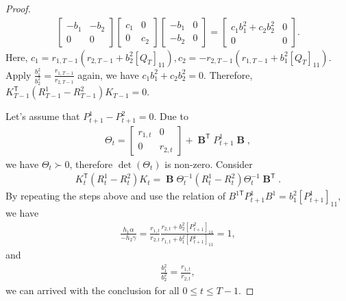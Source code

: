 \documentclass[letterpaper, 10 pt, conference]{ieeeconf}  %
\newcommand{\transpose}{\mathsf{T}}
\DeclareMathOperator{\contB}{\mathbf{B}}
\begin{document}
\begin{proof}
\begin{align*}
\begin{bmatrix}
            -b_{1} & -b_{2}\\
            0 & 0
        \end{bmatrix}
        \begin{bmatrix}
            c_{1} & 0\\
            0 & c_{2}
        \end{bmatrix}
        \begin{bmatrix}
            -b_{1} & 0\\
            -b_{2} & 0
        \end{bmatrix}
        =
        \begin{bmatrix}
            c_{1}b_{1}^{2}+c_{2}b_{2}^{2} & 0\\
            0 & 0
        \end{bmatrix}.
    \end{align*}
    Here, $c_{1} = r_{1,T-1}(r_{2,T-1}+b_{2}^{2}[Q_{T}]_{11}), c_{2} = -r_{2,T-1}(r_{1,T-1}+b_{1}^{2}[Q_{T}]_{11})$. Apply $\frac{b_{1}^{2}}{b_{2}^{2}} = \frac{r_{1,T-1}}{r_{2,T-1}}$ again, we have $c_{1}b_{1}^{2}+c_{2}b_{2}^{2}=0$. Therefore, $K_{T-1}^{\transpose}(R_{T-1}^{1}-R_{T-1}^{2})K_{T-1} = 0$.
    
    Let's assume that $P_{t+1}^{1}-P_{t+1}^{2}=0$. Due to 
    \begin{align*}
        \Theta_{t} = 
        \begin{bmatrix}
            r_{1,t} & 0\\
            0 & r_{2,t}
        \end{bmatrix}
        + \contB^{\transpose}P^{1}_{t+1}\contB,
    \end{align*}
    we have $\Theta_{t} \succ 0$, therefore $\det(\Theta_{t})$ is non-zero.
    Consider 
    \begin{align*}
        K_{t}^{\transpose}(R_{t}^{1}-R_{t}^{2})K_{t}=
        \contB\Theta_{t}^{-1}(R_{t}^{1}-R_{t}^{2})\Theta_{t}^{-1}\contB^{\transpose}.
    \end{align*}
    By repeating the steps above and use the relation of $B^{1\transpose}P_{t+1}^{1}B^{1}=b_{1}^{2}[P_{t+1}^{1}]_{11}$, we have
    \begin{align*}
        \frac{h_{1}\alpha}{-h_{2}\gamma} = \frac{r_{1,t}}{r_{2,t}}\frac{r_{2,t}+b_{2}^{2}[P_{t+1}^{2}]_{11}}{r_{1,t}+b_{1}^{2}[P_{t+1}^{1}]_{11}} = 1,
    \end{align*}
    and 
    \begin{align*}
        \frac{b_{1}^{2}}{b_{2}^{2}} = \frac{r_{1,t}}{r_{2,t}},
    \end{align*}
    we can arrived with the conclusion for all $0 \leq t \leq T-1$.
\end{proof}
\end{document}
